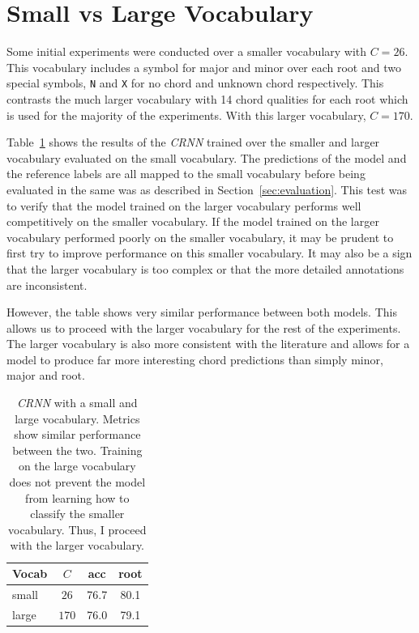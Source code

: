 \section{Small vs Large Vocabulary}\label{app:small_vs_large_vocabulary}

Some initial experiments were conducted over a smaller vocabulary with $C=26$. This vocabulary includes a symbol for major and minor over each root and two special symbols, \texttt{N} and \texttt{X} for no chord and unknown chord respectively. This contrasts the much larger vocabulary with 14 chord qualities for each root which is used for the majority of the experiments. With this larger vocabulary, $C=170$.

Table~\ref{tab:small_vs_large_vocab} shows the results of the \emph{CRNN} trained over the smaller and larger vocabulary evaluated on the small vocabulary. The predictions of the model and the reference labels are all mapped to the small vocabulary before being evaluated in the same was as described in Section~\ref{sec:evaluation}. This test was to verify that the model trained on the larger vocabulary performs well competitively on the smaller vocabulary. If the model trained on the larger vocabulary performed poorly on the smaller vocabulary, it may be prudent to first try to improve performance on this smaller vocabulary. It may also be a sign that the larger vocabulary is too complex or that the more detailed annotations are inconsistent.

However, the table shows very similar performance between both models. This allows us to proceed with the larger vocabulary for the rest of the experiments. The larger vocabulary is also more consistent with the literature and allows for a model to produce far more interesting chord predictions than simply minor, major and root. 

\begin{table}[H]
    \centering
    \begin{tabular}{lccc}
        \toprule
        Vocab & $C$ & acc & root \\  
        \midrule
        small & $26$ & 76.7 & 80.1 \\
        large & $170$ & 76.0 & 79.1 \\
        \bottomrule
    \end{tabular}
    \caption{\emph{CRNN} with a small and large vocabulary. Metrics show similar performance between the two. Training on the large vocabulary does not prevent the model from learning how to classify the smaller vocabulary. Thus, I proceed with the larger vocabulary.}\label{tab:small_vs_large_vocab}
\end{table}

